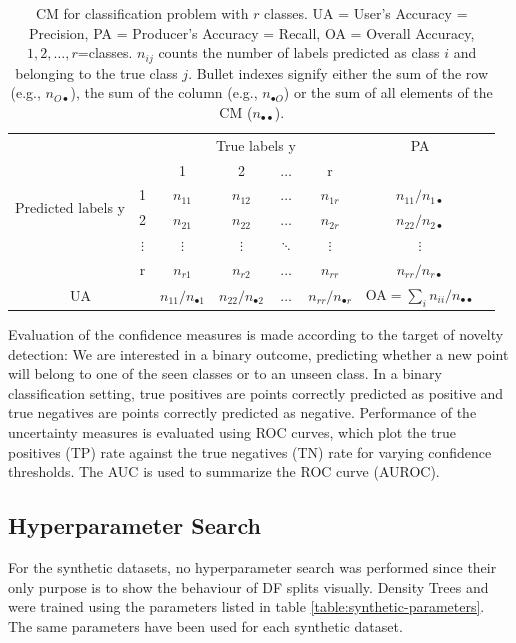 \documentclass[10pt]{article}
\begin{document}
\begin{table}[H]
	\centering
	\begin{tabular}{cc|c|c|c|c|cl}
		& & \multicolumn{4}{c|}{True labels y}&PA\\
		\multirow{4}{*}{Predicted labels y} &  & 1& 2& $\hdots$ &r  &\\ \cline{1-7} 
		& 1 &  $n_{11}$ & $n_{12}$ & $\hdots$ & $n_{1r}$& $n_{11}/n_{1\bullet}$ \\ \cline{2-7} 
		& 2 & $n_{21}$ & $n_{22}$ &$\hdots$  &$n_{2r}$ &$n_{22}/n_{2\bullet}$\\ \cline{2-7} 
		& $\vdots$ & $\vdots$ & $\vdots$ &$\ddots$  &$\vdots$&$\vdots$\\ \cline{2-7} 
		& r & $n_{r1}$ & $n_{r2}$ &$\hdots$  & $n_{rr}$ & $n_{rr}/n_{r\bullet}$ \\\cline{1-7} 
		\multicolumn{2}{c|}{UA} & $n_{11}/n_{\bullet 1}$ & $n_{22}/n_{\bullet 2}$ & $\hdots$ & $n_{rr}/n_{\bullet r}$ & OA$=\sum_in_{ii}/n_{\bullet\bullet}$\\
	\end{tabular}
	\caption{\acrlong{CM} for classification problem with $r$ classes. UA = User's Accuracy = Precision, PA = Producer's Accuracy = Recall, OA = Overall Accuracy, $1,2,\hdots,r$=classes. $n_{ij}$ counts the number of labels predicted as class $i$ and belonging to the true class $j$. Bullet indexes signify either the sum of the row (e.g., $n_{O\bullet}$), the sum of the column (e.g., $n_{\bullet O}$) or the sum of all elements of the \acrlong{CM} ($n_{\bullet\bullet}$).}
	\label{table:cm}
\end{table}

Evaluation of the confidence measures is made according to the target of novelty detection: We are interested in a binary outcome, predicting whether a new point will belong to one of the seen classes or to an unseen class. In a binary classification setting, true positives are points correctly predicted as positive and true negatives are points correctly predicted as negative. Performance of the uncertainty measures is evaluated using \gls{ROC} curves, which plot the true positives (TP) rate against the true negatives (TN) rate for varying confidence thresholds.  The \gls{AUC} is used to summarize the \gls{ROC} curve (\gls{AUROC}).


\subsection{Hyperparameter Search}
\label{subsec:hyperparameter-search}
For the synthetic datasets, no hyperparameter search was performed since their only purpose is to show the behaviour of \acrlong{DF} splits visually. Density Trees and  were trained using the parameters listed in table \ref{table:synthetic-parameters}. The same parameters have been used for each synthetic dataset.
\end{document}
